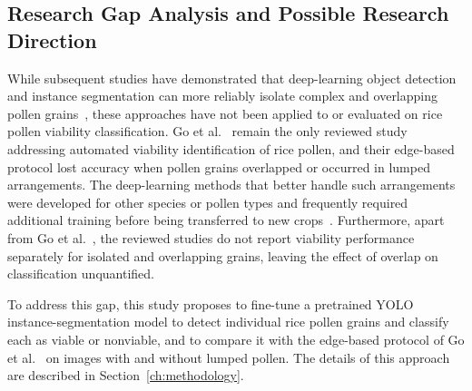\subsection{Research Gap Analysis and Possible Research Direction}
\label{sec:rw-gap-analysis}

While subsequent studies have demonstrated that deep-learning object detection and instance segmentation can more reliably isolate complex and overlapping pollen grains~\cite{zhang2023, gallardo2024, tan2022, li2026pvdt}, these approaches have not been applied to or evaluated on rice pollen viability classification. Go et al.~\cite{go2019} remain the only reviewed study addressing automated viability identification of rice pollen, and their edge-based protocol lost accuracy when pollen grains overlapped or occurred in lumped arrangements. The deep-learning methods that better handle such arrangements were developed for other species or pollen types and frequently required additional training before being transferred to new crops~\cite{tan2022, feng2025}. Furthermore, apart from Go et al.~\cite{go2019}, the reviewed studies do not report viability performance separately for isolated and overlapping grains, leaving the effect of overlap on classification unquantified.

To address this gap, this study proposes to fine-tune a pretrained YOLO instance-segmentation model to detect individual rice pollen grains and classify each as viable or nonviable, and to compare it with the edge-based protocol of Go et al.~\cite{go2019} on images with and without lumped pollen. The details of this approach are described in Section~\ref{ch:methodology}.

